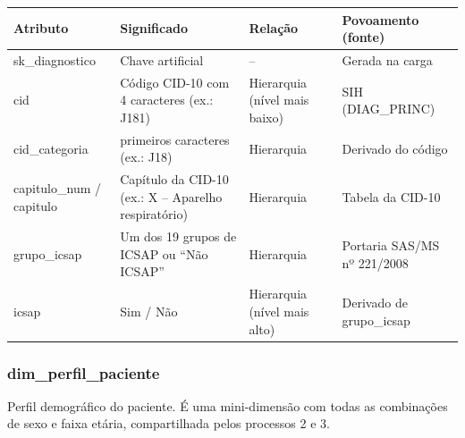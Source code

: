 \documentclass[12pt,a4paper]{article}
\begin{document}
{\small{}\begin{longtable}{|>{\raggedright\arraybackslash}p{}|>{\raggedright\arraybackslash}p{}|>{\raggedright\arraybackslash}p{}|>{\raggedright\arraybackslash}p{}|}\hline\rowcolor{azul}\color{white}\bfseries Atributo & \color{white}\bfseries Significado & \color{white}\bfseries Relação & \color{white}\bfseries Povoamento (fonte) \\ \hline\endhead
sk\_\allowbreak{}diagnostico & Chave artificial & – & Gerada na carga \\ \hline
cid & Código CID-10 com 4 caracteres (ex.: J181) & Hierarquia (nível mais baixo) & SIH (DIAG\_\allowbreak{}PRINC) \\ \hline
cid\_\allowbreak{}categoria & 3 primeiros caracteres (ex.: J18) & Hierarquia & Derivado do código \\ \hline
capitulo\_\allowbreak{}num / capitulo & Capítulo da CID-10 (ex.: X – Aparelho respiratório) & Hierarquia & Tabela da CID-10 \\ \hline
grupo\_\allowbreak{}icsap & Um dos 19 grupos de ICSAP ou “Não ICSAP” & Hierarquia & Portaria SAS/MS nº 221/2008 \\ \hline
icsap & Sim / Não & Hierarquia (nível mais alto) & Derivado de grupo\_\allowbreak{}icsap \\ \hline\end{longtable}}

\subsubsection*{dim\_\allowbreak{}perfil\_\allowbreak{}paciente}

Perfil demográfico do paciente. É uma mini-dimensão com todas as combinações de sexo e faixa etária, compartilhada pelos processos 2 e 3.
\end{document}
